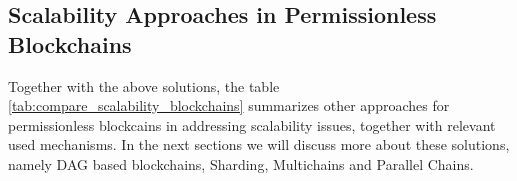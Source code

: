% 
% 

\subsection{Scalability Approaches in Permissionless Blockchains}

Together with the above solutions, the table \ref{tab:compare_scalability_blockchains} summarizes other approaches for permissionless blockcains in addressing scalability issues, together with relevant used mechanisms. %
In the next sections we will discuss more about these solutions, namely \gls{DAG} based blockchains, Sharding, Multichains and Parallel Chains.

